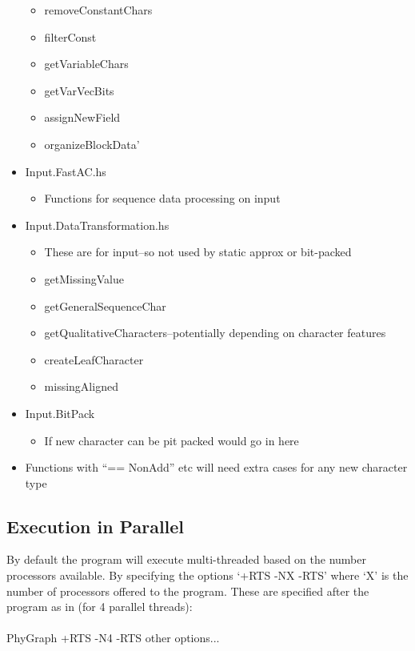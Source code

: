 \documentclass[11pt]{article}
\begin{document}
\begin{itemize}
\begin{itemize}
			 	\item{removeConstantChars}
			 	\item{filterConst}
			 	\item{getVariableChars}
			 	\item{getVarVecBits}
			 	\item{assignNewField}
			 	\item{organizeBlockData'}
			 \end{itemize}
		 	  \item{Input.FastAC.hs}
		 	 \begin{itemize}
		 	 	\item{Functions for sequence data processing on input}
		 	 \end{itemize}
		 	 \item{Input.DataTransformation.hs}
		 	 \begin{itemize}
		 	 	\item{These are for input--so not used by static approx or bit-packed}
		 	 	\item{getMissingValue}
		 	 	\item{getGeneralSequenceChar}
		 	 	\item{getQualitativeCharacters--potentially depending on character features}
		 	 	\item{createLeafCharacter}
		 	 	\item{missingAligned}
		 	 \end{itemize}
	 	 	 \item{Input.BitPack}
	 	 	 \begin{itemize}
	 	 	 	\item{If new character can be pit packed would go in here}
	 	 	 \end{itemize}
		 	 
			 \item{Functions with ``== NonAdd'' etc will need extra cases for any new character type}
	\end{itemize}
	\subsection{Execution in Parallel}
	By default the program will execute multi-threaded based on the number processors available.  By specifying the options `+RTS -NX -RTS' where `X' is the number of processors offered to the program. These are specified after the program as in (for 4 parallel threads):\\
	\\
	PhyGraph +RTS -N4 -RTS other options...  \\
	
\end{document}
